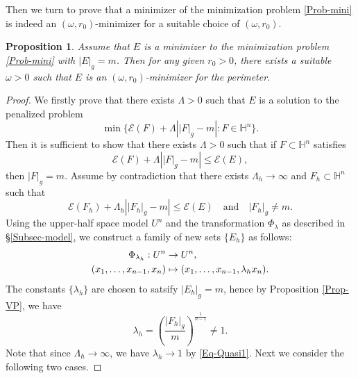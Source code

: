 \documentclass[11pt,reqno]{amsart}
\newtheorem{prop}[thm]{Proposition}
\theoremstyle{definition}
\theoremstyle{remark}
\numberwithin{equation}{section}
\renewcommand{\(}{\left(}
\renewcommand{\)}{\right)}
\renewcommand{\-}{\overline}
\begin{document}
Then we turn to prove that a minimizer of the minimization problem \eqref{Prob-mini} is indeed an $(\omega,r_0)$-minimizer for a suitable choice of $(\omega, r_0)$.
\begin{prop}\label{Prop-Quasi}
	Assume that $E$ is a minimizer to the minimization problem \eqref{Prob-mini} with $|E|_g=m$. Then for any given $r_0>0$, there exists a suitable $\omega>0$ such that $E$ is an $(\omega, r_0)$-minimizer for the perimeter.
\end{prop}
\begin{proof}
	We firstly prove that there exists $\Lambda>0$ such that $E$ is a solution to the penalized problem
	\begin{equation}\label{Eq-pena}
		\min\{\mathcal{E}(F)+\Lambda\left\vert|F|_g-m\right\vert:F\in\mathbb{H}^n\}.
	\end{equation}
Then it is sufficient to show that there exists $\Lambda>0$ such that if $F\subset\mathbb{H}^n$ satisfies
\begin{equation*}
	\mathcal{E}(F)+\Lambda\left||F|_g-m\right|\leq \mathcal{E}(E),
\end{equation*}
then $|F|_g=m$. Assume by contradiction that there exists $\Lambda_h\to\infty$ and  $F_h\subset\mathbb{H}^n$ such that 
\begin{equation}\label{Eq-Quasi1}
	\mathcal{E}(F_h)+\Lambda_h\left||F_h|_g-m\right|\leq \mathcal{E}(E)\quad \text{and}\quad |F_h|_g\neq m.
\end{equation}
Using the upper-half space model $U^n$ and the transformation $\Phi_{\lambda}$  as described in \S\ref{Subsec-model}, we construct a family of new sets $\{E_h\}$ as follows:
\begin{align*}
	\Phi_{\lambda_h}: U^n&\to U^n,\notag\\
	(x_1,\dots,x_{n-1},x_n)&\mapsto(x_1,\dots,x_{n-1},\lambda_h x_n).
\end{align*}
The constants $\{\lambda_h\}$ are chosen to satsify $|E_h|_g=m$, hence by Proposition \ref{Prop-VP}, we have 
\begin{equation*}
	\lambda_h=\left(\frac{|F_h|_g}{m}\right)^{\frac{1}{n-1}}\neq 1.
\end{equation*}
Note that since $\Lambda_h\to\infty$, we have $\lambda_h\to 1$ by \eqref{Eq-Quasi1}. Next we consider the following two cases. 


\end{proof}
\end{document}

